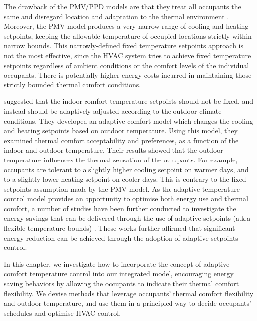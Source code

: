 The drawback of the PMV/PPD models are that they treat all occupants the same and disregard location and adaptation to the thermal environment \citep{mui2003adaptive,ye2006field}. Moreover, the PMV model produces a very narrow range of cooling and heating setpoints, keeping the allowable temperature of occupied locations strictly within narrow bounds. This narrowly-defined fixed temperature setpoints approach is not the most effective, since the HVAC system tries to achieve fixed temperature setpoints regardless of ambient conditions or the comfort levels of the individual occupants. There is potentially higher energy costs incurred in maintaining those strictly bounded thermal comfort conditions.

\cite{de1998developing} suggested that the indoor comfort temperature setpoints should not be fixed, and instead should be adaptively adjusted according to the outdoor climate conditions. They developed an adaptive comfort model which changes the cooling and heating setpoints based on outdoor temperature. Using this model, they examined thermal comfort acceptability and preferences, as a function of the indoor and outdoor temperature. Their results showed that the outdoor temperature influences the thermal sensation of the occupants. For example, occupants are tolerant to a slightly higher cooling setpoint on warmer days, and to a slightly lower heating setpoint on cooler days. This is contrary to the fixed setpoints assumption made by the PMV model. As the adaptive temperature control model provides an opportunity to optimise both energy use and thermal comfort, a number of studies have been further conducted to investigate the energy savings that can be delivered through the use of adaptive setpoints (a.k.a flexible temperature bounds) \citep{egan2010the,ward2010automate,west2014trial,yang2013development,chew2015adaptive}. These works further affirmed that significant energy reduction can be achieved through the adoption of adaptive setpoints control.

In this chapter, we investigate how to incorporate the concept of adaptive comfort temperature control into our integrated model, encouraging energy saving behaviors by allowing the occupants to indicate their thermal comfort flexibility. We devise methods that leverage occupants' thermal comfort flexibility and outdoor temperature, and use them in a principled way to decide occupants' schedules and optimise HVAC control. 

